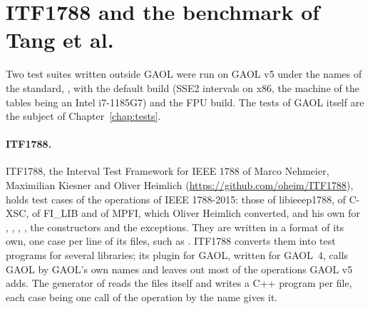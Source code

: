\section{ITF1788 and the benchmark of Tang et al.}
\label{sec:test-suites}
%

Two test suites written outside GAOL were run on GAOL v5 under the names of
the standard, , with the default build (SSE2 intervals
on x86, the machine of the tables being an Intel i7-1185G7) and the FPU build. The tests of GAOL
itself are the subject of Chapter~\ref{chap:tests}.

\paragraph{ITF1788.}
ITF1788, the Interval Test Framework for IEEE 1788 of Marco Nehmeier,
Maximilian Kiesner and Oliver Heimlich
(\url{https://github.com/oheim/ITF1788}), holds test cases of the
operations of IEEE 1788-2015: those of libieeep1788, of C-XSC, of FI\_LIB
and of MPFI, which Oliver Heimlich converted, and his own for ,
, , , the constructors and the
exceptions. They are written in a format of its own, one case per line of
its  files, such as
. ITF1788 converts them into test
programs for several libraries; its plugin for GAOL, written for GAOL~4,
calls GAOL by GAOL's own names and leaves out most of the operations GAOL
v5 adds. The generator of  reads the
 files itself and writes a C++ program per file, each case being
one call of the operation by the name  gives it.

